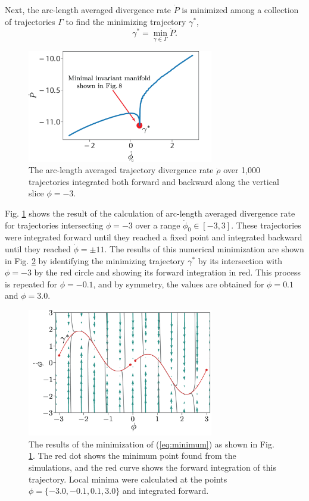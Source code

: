 \documentclass[twocolumn]{svjour3}
\begin{document}
Next, the arc-length averaged divergence rate $\dot{P}$ is minimized among a collection of trajectories $\Gamma$ to find the minimizing trajectory $\gamma^*$,
\begin{equation}\label{eq:minimum}
\gamma^*=\min_{\gamma\in\Gamma}\dot{P}.
\end{equation}
\begin{figure}
\centering
\includegraphics[width=3.2in]{Figures/rho-dot-field-update.png}
\caption{The arc-length averaged trajectory divergence rate $\dot{\rho}$ over 1,000 trajectories integrated both forward and backward along the vertical slice $\phi=-3$.}
\label{fig:min-rhodot}
\end{figure}

Fig. \ref{fig:min-rhodot} shows the result of the calculation of arc-length averaged divergence rate for trajectories intersecting $\phi=-3$ over a range $\dot{\phi}_0\in[-3, 3]$. These trajectories were integrated forward until they reached a fixed point and integrated backward until they reached $\dot{\phi}=\pm11$. The results of this numerical minimization are shown in Fig. \ref{fig:min-rhodot-comp} by identifying the minimizing trajectory $\gamma^*$ by its intersection with $\phi=-3$ by the red circle and showing its forward integration in red. This process is repeated for $\phi=-0.1$, and by symmetry, the values are obtained for $\phi=0.1$ and $\phi=3.0$.

\begin{figure}
\centering
\includegraphics[width=3.2in]{Figures/min-rho-dot-mod.png}
\caption{The results of the minimization of (\ref{eq:minimum}) as shown in Fig. \ref{fig:min-rhodot}. The red dot shows the minimum point found from the simulations, and the red curve shows the forward integration of this trajectory. Local minima were calculated at the points $\phi=\{-3.0, -0.1, 0.1, 3.0\}$ and integrated forward.}
\label{fig:min-rhodot-comp}
\end{figure}
\end{document}
